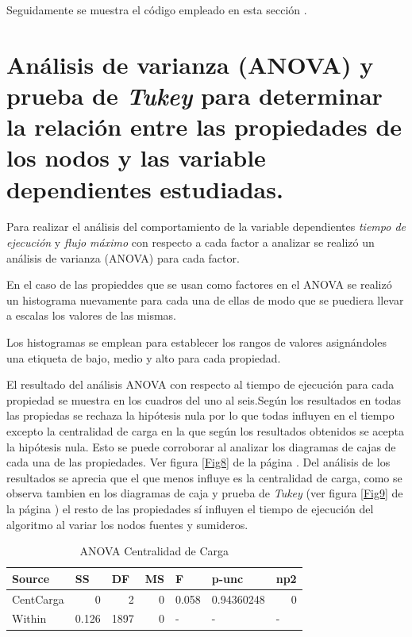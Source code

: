 \documentclass{article}
\begin{document}
Seguidamente se muestra el código empleado en esta sección
\newpage
.


\section{Análisis de varianza (ANOVA) y prueba de \textit{Tukey} para determinar la relación entre las propiedades de los nodos y las variable dependientes estudiadas.} 


Para realizar el análisis del comportamiento de la variable dependientes \textit{tiempo de ejecución} y \textit{flujo máximo} con respecto a cada factor a analizar se realizó un análisis de varianza (ANOVA) para cada factor.

En el caso de las propieddes que se usan como factores en el ANOVA se realizó un histograma nuevamente para cada una de ellas de modo que se puediera llevar a escalas los valores de las mismas.

Los histogramas se emplean para establecer los rangos de valores asignándoles una etiqueta de bajo, medio y alto para cada propiedad.

El resultado del análisis ANOVA con respecto al tiempo de ejecución para cada propiedad se muestra en los cuadros del uno al seis.Según los resultados en todas las propiedas se rechaza la hipótesis nula por lo que todas influyen en el tiempo excepto la centralidad de carga en la que según los resultados obtenidos se acepta la hipótesis nula. Esto se puede corroborar al analizar los diagramas de cajas de cada una de las propiedades. Ver figura \ref{Fig8} de la página \pageref{Fig8}. Del análisis de los resultados se aprecia que el que menos influye es la centralidad de carga, como se observa tambien en los diagramas de caja y prueba de \textit{Tukey} (ver figura \ref{Fig9} de la página \pageref{Fig9}) el resto de las propiedades sí influyen el tiempo de ejecución del algoritmo al variar los nodos fuentes y sumideros.   

\begin{table}[htbp]
  \centering
  \caption{ANOVA Centralidad de Carga}
    \begin{tabular}{lrrrlll}
    \textbf{Source} & \multicolumn{1}{l}{\textbf{SS}} & \multicolumn{1}{l}{\textbf{DF}} & \multicolumn{1}{l}{\textbf{MS}} & \textbf{F} & \textbf{p-unc} & \textbf{np2} \\
    \midrule
    CentCarga & 0     & 2     & 0     & \multicolumn{1}{r}{0.058} & \multicolumn{1}{r}{0.94360248} & \multicolumn{1}{r}{0} \\
    Within & 0.126 & 1897  & 0     & -     & -     & - \\
    \bottomrule
    \end{tabular}%
  \label{tab:addlabel}%
\end{table}%
\end{document}
